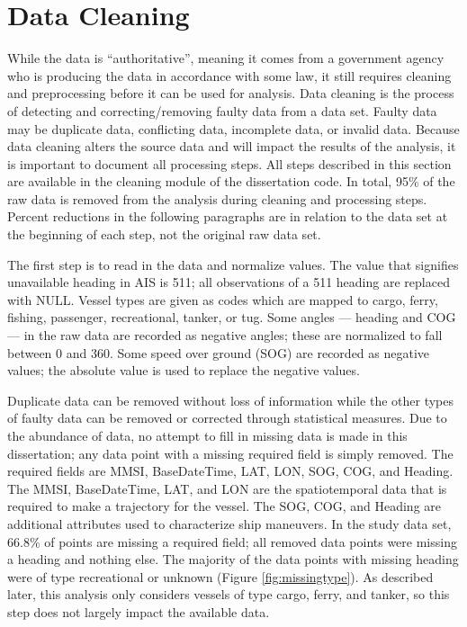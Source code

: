 \documentclass[twoside,symmetric,notoc]{tufte-book}
\begin{document}
\section{Data Cleaning}
\par{%
While the data is ``authoritative'', meaning it comes from a government agency who is producing the data in accordance with some law, it still requires cleaning and preprocessing before it can be used for analysis. Data cleaning is the process of detecting and correcting/removing faulty data from a data set. Faulty data may be duplicate data, conflicting data, incomplete data, or invalid data. Because data cleaning alters the source data and will impact the results of the analysis, it is important to document all processing steps. All steps described in this section are available in the cleaning module of the dissertation code. In total, 95\% of the raw data is removed from the analysis during cleaning and processing steps. Percent reductions in the following paragraphs are in relation to the data set at the beginning of each step, not the original raw data set.
}
\par{
The first step is to read in the data and normalize values. The value that signifies unavailable heading in AIS is 511; all observations of a 511 heading are replaced with NULL. Vessel types are given as codes which are mapped to cargo, ferry, fishing, passenger, recreational, tanker, or tug. Some angles --- heading and COG --- in the raw data are recorded as negative angles; these are normalized to fall between 0 and 360. Some speed over ground (SOG) are recorded as negative values; the absolute value is used to replace the negative values.
}
\par{
Duplicate data can be removed without loss of information while the other types of faulty data can be removed or corrected through statistical measures.\cite{VanDenBroeck} Due to the abundance of data, no attempt to fill in missing data is made in this dissertation; any data point with a missing required field is simply removed. The required fields are MMSI, BaseDateTime, LAT, LON, SOG, COG, and Heading. The MMSI, BaseDateTime, LAT, and LON are the spatiotemporal data that is required to make a trajectory for the vessel. The SOG, COG, and Heading are additional attributes used to characterize ship maneuvers. In the study data set, 66.8\% of points are missing a required field; all removed data points were missing a heading and nothing else. The majority of the data points with missing heading were of type recreational or unknown (Figure \ref{fig:missingtype}). As described later, this analysis only considers vessels of type cargo, ferry, and tanker, so this step does not largely impact the available data.
}
\end{document}
